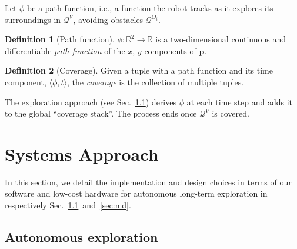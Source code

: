 \documentclass[letterpaper,10pt,conference,twoside]{IEEEtran}
\theoremstyle{definition}
\newtheorem{defn}{Definition}[section]
\begin{document}
Let $\phi$ be a path function, i.e., a function the robot tracks as it explores its surroundings in $\mathcal{Q}^V$, avoiding %
obstacles $\mathcal{Q}^{O_i}$.

\begin{defn}[Path function]\label{def:pf}
  $\phi:\mathbb{R}^2\rightarrow\mathbb{R}$ is a two-dimensional continuous and differentiable \textit{path function} of the $x$, $y$ components of $\mathbf{p}$.
\end{defn}

\begin{defn}[Coverage]\label{def:co}
  Given a tuple with a path function and its time component, $\langle\phi,t\rangle$, the \textit{coverage} is the collection of multiple tuples.
\end{defn}

The %
exploration approach %
(see Sec.~\ref{sec:le}) derives $\phi$ at each time step and adds it to the global ``coverage stack''. The process ends once $\mathcal{Q}^V$ is covered.


\section{Systems Approach}
\label{sec:m}
\noindent
In this section, we detail the implementation and design choices in terms of %
our software and low-cost hardware for autonomous long-term %
exploration in respectively Sec.~\ref{sec:le}~and~\ref{sec:md}.

\subsection{Autonomous %
exploration}
\label{sec:le}
\end{document}
